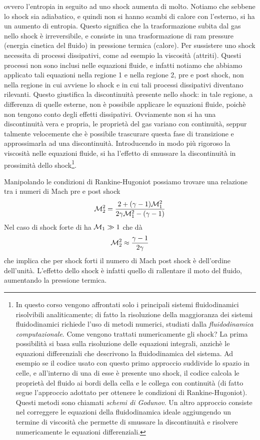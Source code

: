 ovvero l'entropia in seguito ad uno shock aumenta di molto. Notiamo che sebbene lo shock sia adiabatico, e quindi non si hanno scambi di calore con l'esterno, si ha un aumento di entropia. Questo significa che la trasformazione subita dal gas nello shock è irreversibile, e consiste in una trasformazione di ram pressure (energia cinetica del fluido) in pressione termica (calore). Per sussistere uno shock necessita di processi dissipativi, come ad esempio la viscosità (attriti). Questi processi non sono inclusi nelle equazioni fluide, e infatti notiamo che abbiamo applicato tali equazioni nella regione 1 e nella regione 2, pre e post shock, non nella regione in cui avviene lo shock e in cui tali processi dissipativi diventano rilevanti. Questo giustifica la discontinuità presente nello shock: in tale regione, a differenza di quelle esterne, non è possibile applicare le equazioni fluide, poichè non tengono conto degli effetti dissipativi. Ovviamente non si ha una discontinuità vera e propria, le proprietà del gas variano con continuità, seppur talmente velocemente che è possibile trascurare questa fase di transizione e approssimarla ad una discontinuità. Introducendo in modo più rigoroso la viscosità nelle equazioni fluide, si ha l'effetto di smussare la discontinuità in prossimità dello shock\footnote{In questo corso vengono affrontati solo i principali sistemi fluidodinamici risolvibili analiticamente; di fatto la risoluzione della maggioranza dei sistemi fluidodinamici richiede l'uso di metodi numerici, studiati dalla \textit{fluidodinamica computazionale}. Come vengono trattati numericamente gli shock? La prima possibilità si basa sulla risoluzione delle equazioni integrali, anzichè le equazioni differenziali che descrivono la fluidodinamica del sistema. Ad esempio se il codice usato con questo primo approccio suddivide lo spazio in celle, e all'interno di una di esse è presente uno shock, il codice calcola le proprietà del fluido ai bordi della cella e le collega con continuità (di fatto segue l'approccio adottato per ottenere le condizioni di Rankine-Hugoniot). Questi metodi sono chiamati \textit{schemi di Godunov}. Un altro approccio consiste nel correggere le equazioni della fluidodinamica ideale aggiungendo un termine di viscosità che permette di smussare la discontinuità e risolvere numericamente le equazioni differenziali.}.

Manipolando le condizioni di Rankine-Hugoniot possiamo trovare una relazione tra i numeri di Mach pre e post shock
\begin{equation}
\mathcal{M}_2^2 = \dfrac{2+(\gamma -1) \mathcal{M}_1^2}{2\gamma \mathcal{M}_1^2 - (\gamma -1)}
\end{equation}
Nel caso di shock forte di ha $\mathcal{M}_1 \gg 1$ che dà
\begin{equation}
\mathcal{M}_2^2 \approx \dfrac{\gamma -1}{2\gamma}
\end{equation}
che implica che per shock forti il numero di Mach post shock è dell'ordine dell'unità. L'effetto dello shock è infatti quello di rallentare il moto del fluido, aumentando la pressione termica.

